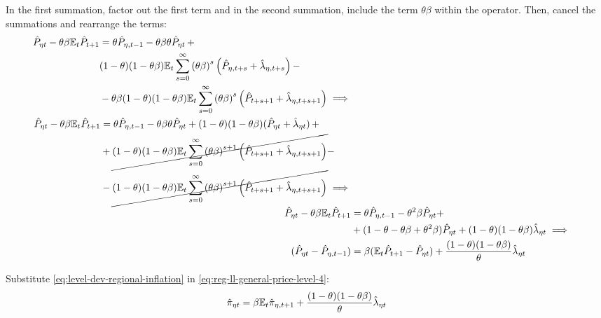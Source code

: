 \documentclass[
thesis.tex
]{subfiles}
\begin{document}
In the first summation, factor out the first term and in the second summation, include the term $\theta \beta$ within the operator. Then, cancel the summations and rearrange the terms:
\begin{align}
	\begin{split}
		\hat{P}_{\eta t} - \theta \beta {\mathbb{E}_{t}} \hat{P}_{t+1} &= \theta \hat{P}_{\eta, t-1} - \theta \beta \theta \hat{P}_{\eta t} \, + \\
		& (1-\theta) (1- \theta \beta) {\mathbb{E}_{t}} \sum_{s=0}^{\infty} \left( \theta \beta \right)^s \left( \hat{P}_{\eta, t+s} + \hat{\lambda}_{\eta, t+s} \right) -
		\\
		& - \theta \beta (1-\theta) (1- \theta \beta) {\mathbb{E}_{t}} \sum_{s=0}^{\infty} \left( \theta \beta \right)^s \left( \hat{P}_{t+s+1} + \hat{\lambda}_{\eta, t+s+1} \right) \implies \nonumber 
	\end{split} \\
	\begin{split}
		\hat{P}_{\eta t} - \theta \beta {\mathbb{E}_{t}} \hat{P}_{t+1} &= \theta \hat{P}_{\eta, t-1} - \theta \beta \theta \hat{P}_{\eta t} + (1-\theta) (1- \theta \beta) (\hat{P}_{\eta t} + \hat{\lambda}_{\eta t}) \, + 
		\\
		& + \cancel{(1-\theta) (1- \theta \beta) {\mathbb{E}_{t}} \sum_{s=0}^{\infty} \left( \theta \beta \right)^{s+1} \left( \hat{P}_{t+s+1} + \hat{\lambda}_{\eta, t+s+1} \right)} -
		\\
		& - \cancel{(1-\theta) (1- \theta \beta) {\mathbb{E}_{t}} \sum_{s=0}^{\infty} \left( \theta \beta \right)^{s+1} \left( \hat{P}_{t+s+1} + \hat{\lambda}_{\eta, t+s+1} \right)} \implies \nonumber 
	\end{split} \\
	\hat{P}_{\eta t} - \theta \beta {\mathbb{E}_{t}} \hat{P}_{t+1} &= \theta \hat{P}_{\eta, t-1} - \theta^2 \beta \hat{P}_{\eta t} + \nonumber \\
	& + (1- \theta -\theta \beta + \theta^2 \beta) \hat{P}_{\eta t} + (1-\theta) (1- \theta \beta) \hat{\lambda}_{\eta t} \implies \nonumber \\
	(\hat{P}_{\eta t} - \hat{P}_{\eta, t-1}) &= \beta ({\mathbb{E}_{t}} \hat{P}_{t+1} - \hat{P}_{\eta t}) + \frac{(1-\theta) (1- \theta \beta)}{\theta} \hat{\lambda}_{\eta t}
	\label{eq:reg-ll-general-price-level-4}
\end{align}

Substitute \ref{eq:level-dev-regional-inflation} in \ref{eq:reg-ll-general-price-level-4}:
\begin{align}
	\hat{\pi}_{\eta t} = \beta {\mathbb{E}_{t}} \hat{\pi}_{\eta, t+1} + \frac{(1-\theta) (1- \theta \beta)}{\theta} \hat{\lambda}_{\eta t} \label{eq:reg-nk-phillips-curve-mc}
\end{align}
\end{document}
